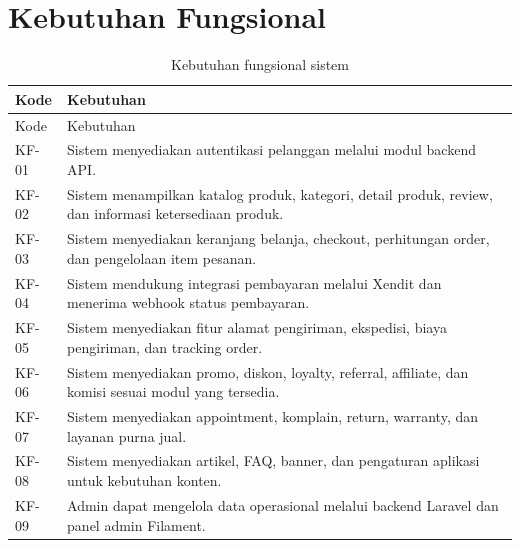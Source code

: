 \documentclass[12pt,a4paper]{report}
\begin{document}
\section{Kebutuhan Fungsional}
\begin{longtable}{p{}p{}}
\caption{Kebutuhan fungsional sistem}\\
\toprule
Kode & Kebutuhan \\
\midrule
\endfirsthead
\toprule
Kode & Kebutuhan \\
\midrule
\endhead
KF-01 & Sistem menyediakan autentikasi pelanggan melalui modul backend API. \\
KF-02 & Sistem menampilkan katalog produk, kategori, detail produk, review, dan informasi ketersediaan produk. \\
KF-03 & Sistem menyediakan keranjang belanja, checkout, perhitungan order, dan pengelolaan item pesanan. \\
KF-04 & Sistem mendukung integrasi pembayaran melalui Xendit dan menerima webhook status pembayaran. \\
KF-05 & Sistem menyediakan fitur alamat pengiriman, ekspedisi, biaya pengiriman, dan tracking order. \\
KF-06 & Sistem menyediakan promo, diskon, loyalty, referral, affiliate, dan komisi sesuai modul yang tersedia. \\
KF-07 & Sistem menyediakan appointment, komplain, return, warranty, dan layanan purna jual. \\
KF-08 & Sistem menyediakan artikel, FAQ, banner, dan pengaturan aplikasi untuk kebutuhan konten. \\
KF-09 & Admin dapat mengelola data operasional melalui backend Laravel dan panel admin Filament. \\
\bottomrule
\end{longtable}
\end{document}
